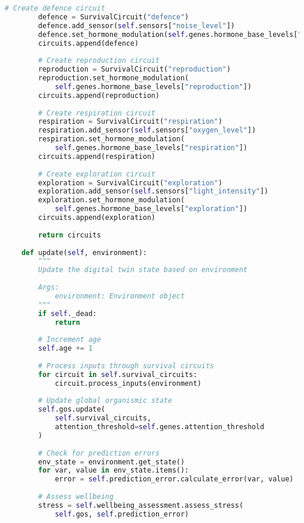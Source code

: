 \documentclass[11pt,a4paper]{article}
\begin{document}
\begin{lstlisting}[language=Python]
        # Create defence circuit
        defence = SurvivalCircuit("defence")
        defence.add_sensor(self.sensors["noise_level"])
        defence.set_hormone_modulation(self.genes.hormone_base_levels["defence"])
        circuits.append(defence)
        
        # Create reproduction circuit
        reproduction = SurvivalCircuit("reproduction")
        reproduction.set_hormone_modulation(
            self.genes.hormone_base_levels["reproduction"])
        circuits.append(reproduction)
        
        # Create respiration circuit
        respiration = SurvivalCircuit("respiration")
        respiration.add_sensor(self.sensors["oxygen_level"])
        respiration.set_hormone_modulation(
            self.genes.hormone_base_levels["respiration"])
        circuits.append(respiration)
        
        # Create exploration circuit
        exploration = SurvivalCircuit("exploration")
        exploration.add_sensor(self.sensors["light_intensity"])
        exploration.set_hormone_modulation(
            self.genes.hormone_base_levels["exploration"])
        circuits.append(exploration)
        
        return circuits
        
    def update(self, environment):
        """
        Update the digital twin state based on environment
        
        Args:
            environment: Environment object
        """
        if self._dead:
            return
            
        # Increment age
        self.age += 1
        
        # Process inputs through survival circuits
        for circuit in self.survival_circuits:
            circuit.process_inputs(environment)
            
        # Update global organismic state
        self.gos.update(
            self.survival_circuits, 
            attention_threshold=self.genes.attention_threshold
        )
        
        # Check for prediction errors
        env_state = environment.get_state()
        for var, value in env_state.items():
            error = self.prediction_error.calculate_error(var, value)
            
        # Assess wellbeing
        stress = self.wellbeing_assessment.assess_stress(
            self.gos, self.prediction_error)
            

\end{lstlisting}
\end{document}
